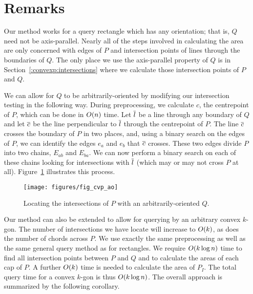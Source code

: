 \section{Remarks}
\label{:convexp:remarks}

Our method works for a query rectangle which has any orientation; that is, $Q$ need not be axis-parallel. Nearly all of the steps involved in calculating the area are only concerned with edges of $P$ and intersection points of lines through the boundaries of $Q$. The only place we use the axis-parallel property of $Q$ is in Section~\ref{:convexp:intersections} where we calculate those intersection points of $P$ and $Q$.

We can allow for $Q$ to be arbitrarily-oriented by modifying our intersection testing in the following way. 
During preprocessing, we calculate $c$, the centrepoint of $P$, which can be done in $O\!\left(n\right)$ time.
Let $\overline{l}$ be a line through any boundary of $Q$ and let $\overline{c}$ be the line perpendicular to $\overline{l}$ through the centrepoint of $P$.
The line $\overline{c}$ crosses the boundary of $P$ in two places, and, using a binary search on the edges of $P$, we can identify the edges $e_a$ and $e_b$ that $\overline{c}$ crosses.
These two edges divide $P$ into two chains, $E_{ab}$ and $E_{ba}$.
We can now perform a binary search on each of these chains looking for intersections with $\overline{l}$ (which may or may not cross $P$ at all).
Figure~\ref{fig:convexp:ao} illustrates this process.

\begin{figure}[t]
\begin{center}
  \texttt{[image: figures/fig\_cvp\_ao]}
  \caption{Locating the intersections of $P$ with an arbitrarily-oriented $Q$.}
  \label{fig:convexp:ao}
\end{center}
\end{figure}

Our method can also be extended to allow for querying by an arbitrary convex $k$-gon.
The number of intersections we have locate will increase to $O\!\left(k\right)$, as does the number of chords across $P$.
We use exactly the same preprocessing as well as the same general query method as for rectangles. 
We require $O\!\left(k \log{n}\right)$ time to find all intersection points between $P$ and $Q$ and to calculate the areas of each cap of $P$. A further $O\!\left(k\right)$ time is needed to calculate the area of $P_I$. 
The total query time for a convex $k$-gon is thus $O\!\left(k \log{n}\right)$.
The overall approach is summarized by the following corollary.

